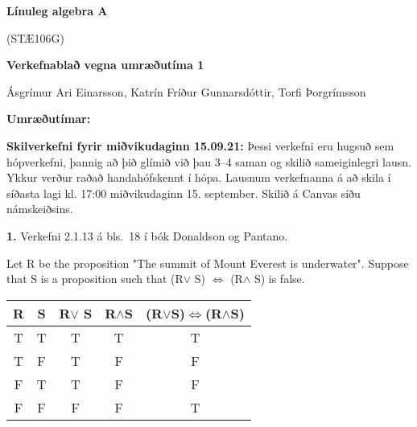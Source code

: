 \documentclass[12pt]{article}
\begin{document}
\pagestyle{empty}


\newcommand{\Ov}{\mbox{${\bf 0}$}}
\newcommand{\rv}{\mbox{${\bf r}$}}
\newcommand{\vv}{\mbox{${\bf v}$}}
\newcommand{\xv}{\mbox{${\bf x}$}}
\newcommand{\yv}{\mbox{${\bf y}$}}
\newcommand{\av}{\mbox{${\bf a}$}}
\newcommand{\bv}{\mbox{${\bf b}$}}
\newcommand{\cv}{\mbox{${\bf c}$}}
\newcommand{\iv}{\mbox{${\bf i}$}}
\newcommand{\jv}{\mbox{${\bf j}$}}
\newcommand{\kv}{\mbox{${\bf k}$}}

\newcommand{\ZZ}{\mbox{$\mathbb{Z}$}}
\newcommand{\NN}{\mbox{$\mathbb{N}$}}
\newcommand{\QQ}{\mbox{$\mathbb{Q}$}}
\newcommand{\RR}{\mbox{$\mathbb{R}$}}
\newcommand{\CC}{\mbox{$\mathbb{C}$}}

\newcommand{\RRk}{\mbox{$\mathbb{R}^k$}}
\newcommand{\RRn}{\mbox{$\mathbb{R}^n$}}
\newcommand{\RRm}{\mbox{$\mathbb{R}^m$}}

\author{Ásgrímur Ari Einarsson,  Katrín Fríður Gunnarsdóttir, Torfi Þorgrímsson}

\centerline{\bf \Huge Línuleg algebra A}
\centerline{(STÆ106G)}
\medskip
\centerline{\bf \Large Verkefnablað vegna umræðutíma 1}

\medskip

\begin{center}
	Ásgrímur Ari Einarsson,  Katrín Fríður Gunnarsdóttir, Torfi Þorgrímsson
\end{center}

{\bf Umræðutímar:}


\bigskip
{\bf Skilverkefni fyrir miðvikudaginn 15.09.21:}  Þessi verkefni eru hugsuð sem hópverkefni, þannig að þið glímið við þau 3--4 saman og skilið sameiginlegri lausn.  Ykkur verður raðað handahófskennt í hópa.  Lausnum verkefnanna á að skila í síðasta lagi kl. 17:00  miðvikudaginn 15. september.  Skilið á Canvas síðu námskeiðsins.

\smallskip

{\bf 1.}  Verkefni 2.1.13 á bls.~18 í bók Donaldson og Pantano.

Let R be the proposition "The summit of Mount Everest is underwater". Suppose that S is a
proposition such that (R$\lor$ S) $\Longleftrightarrow$  (R$\land$ S)  is false.

\begin{center}
   \begin{tabular}{||c c c c c||} 
	\hline
	R & S & R$\vee$ S & R$\wedge$S &(R$\vee$S)$\Longleftrightarrow$(R$\wedge$S) \\ [0.5ex] 
	\hline\hline
	T & T & T & T & T\\ 
	\hline 
	\hline
	T & F & T & F & F\\ 
	\hline 
	\hline
	F & T & T & F & F\\ 
	\hline 
	\hline
	F & F & F & F & T\\ 
	\hline 
	\hline
   \end{tabular}
   \end{center}
\end{document}
